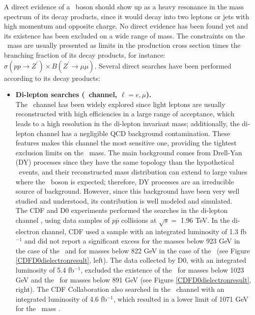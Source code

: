 \noindent A direct evidence of a \Zprime~boson should show up as a heavy resonance in 
the mass spectrum of its decay products, since it would decay into two leptons or jets
with high momentum and opposite charge. No direct evidence has 
been found yet and its existence has been excluded on a wide range of mass. The constraints 
on the \Zprime~mass are usually presented as limits in the production cross section
times the branching fraction of its decay products, for instance: $\sigma ( pp \rightarrow Z^{\prime})\times B(Z^{\prime} \rightarrow \mu\mu)$. Several 
direct searches have been performed according to its decay products:

\begin{itemize}
 \item \textbf{Di-lepton searches (\Zprimetoll~channel, $\ell=e, \mu$).}\\

\noindent The \Zprimetoll~channel has been widely explored since light leptons
are usually reconstructed with high efficiencies in a large range of acceptance, which leads
to a high resolution in the di-lepton invariant mass; additionally, the di-lepton channel
has a negligible QCD background contamination. These features makes this channel the most 
sensitive one, providing the tightest exclusion limits on the \Zprime~mass. The main background comes 
from Drell-Yan (DY) processes since they have the same topology than the 
hypothetical \Zprime~events, and their reconstructed mass distribution can extend to large values where the
\Zprime~boson is expected; therefore, DY processes are an irreducible source of background. However, since 
this background have been very well studied and understood, its contribution is well modeled and simulated. \\

\noindent The CDF and D0 experiments performed the searches in the di-lepton
channel \cite{CDFZprimedielectronbib,CDFZprimedimuonbib,D0Zprimetodielectronbib},
using data samples of $p\bar{p}$ collisions at $\sqrt{s}=$ 1.96 TeV. In the di-electron 
channel, CDF used a sample with an integrated luminosity of 1.3 fb$^{-1}$ and did not report a 
significant excess for the masses below 923 GeV in the case of the \ZprimeSSM~and for masses below 822 GeV 
in the case of the \Zprimepsi~(see Figure \ref{CDFD0dielectronresult}, left). The data collected by D0, with 
an integrated luminosity of 5.4 fb$^{-1}$, excluded the existence of the \ZprimeSSM~for masses below 1023 GeV
and the \Zprimepsi~for masses below 891 GeV (see Figure \ref{CDFD0dielectronresult}, right). The CDF Collaboration 
also searched in the \Zprimetomumu~channel with an integrated luminosity of 4.6 fb$^{-1}$, which 
resulted in a lower limit of 1071 GeV for the \ZprimeSSM~mass \cite{CDFZprimedimuonbib}. \\


\end{itemize}
